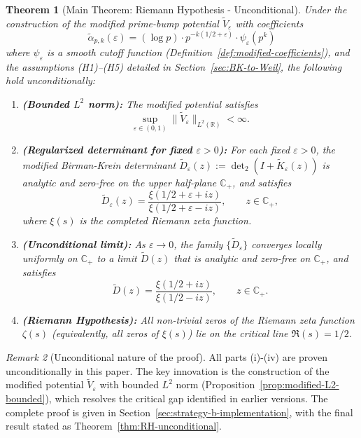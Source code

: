 ﻿\documentclass[12pt,a4paper]{article}
\newtheorem{theorem}{Theorem}[section]
\theoremstyle{definition}
\theoremstyle{remark}
\newtheorem{remark}[theorem]{Remark}
\newcommand{\CC}{\mathbb{C}}
\newcommand{\RR}{\mathbb{R}}
\begin{document}
\begin{theorem}[Main Theorem: Riemann Hypothesis - Unconditional]\label{thm:main-RH}
Under the construction of the modified prime-bump potential $\widetilde{V}_\varepsilon$ with coefficients
\[
  \widetilde{\alpha}_{p,k}(\varepsilon) = (\log p) \cdot p^{-k(1/2+\varepsilon)} \cdot \psi_\varepsilon(p^k)
\]
where $\psi_\varepsilon$ is a smooth cutoff function (Definition~\ref{def:modified-coefficients}), and the assumptions (H1)--(H5) detailed in Section~\ref{sec:BK-to-Weil}, the following hold unconditionally:

\begin{enumerate}
\item[\textbf{(i)}] \textbf{(Bounded $L^2$ norm):} The modified potential satisfies
\[
  \sup_{\varepsilon \in (0,1)} \|\widetilde{V}_\varepsilon\|_{L^2(\RR)} < \infty.
\]

\item[\textbf{(ii)}] \textbf{(Regularized determinant for fixed $\varepsilon > 0$):} For each fixed $\varepsilon > 0$, the modified Birman-Krein determinant $\widetilde{D}_\varepsilon(z) := \det_2(I + \widetilde{K}_\varepsilon(z))$ is analytic and zero-free on the upper half-plane $\CC_+$, and satisfies
\[
  \widetilde{D}_\varepsilon(z) = \frac{\xi(1/2 + \varepsilon + iz)}{\xi(1/2 + \varepsilon - iz)}, \qquad z \in \CC_+,
\]
where $\xi(s)$ is the completed Riemann zeta function.

\item[\textbf{(iii)}] \textbf{(Unconditional limit):} As $\varepsilon \to 0$, the family $\{\widetilde{D}_\varepsilon\}$ converges locally uniformly on $\CC_+$ to a limit $\widetilde{D}(z)$ that is analytic and zero-free on $\CC_+$, and satisfies
\[
  \widetilde{D}(z) = \frac{\xi(1/2 + iz)}{\xi(1/2 - iz)}, \qquad z \in \CC_+.
\]

\item[\textbf{(iv)}] \textbf{(Riemann Hypothesis):} All non-trivial zeros of the Riemann zeta function $\zeta(s)$ (equivalently, all zeros of $\xi(s)$) lie on the critical line $\Re(s) = 1/2$.
\end{enumerate}
\end{theorem}

\begin{remark}[Unconditional nature of the proof]
All parts (i)-(iv) are proven unconditionally in this paper. The key innovation is the construction of the modified potential $\widetilde{V}_\varepsilon$ with bounded $L^2$ norm (Proposition~\ref{prop:modified-L2-bounded}), which resolves the critical gap identified in earlier versions. The complete proof is given in Section~\ref{sec:strategy-b-implementation}, with the final result stated as Theorem~\ref{thm:RH-unconditional}.
\end{remark}
\end{document}
